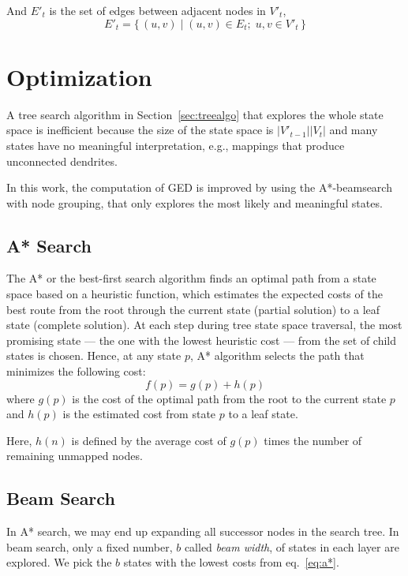 \documentclass[10pt,letterpaper]{article}
\begin{document}
And $E'_t$ is the set of edges between adjacent nodes in $V'_t$, 
\begin{equation}
E'_t = \{\, (u, v) \mid (u, v) \in E_t ;\; u, v \in V'_t \,\}
\end{equation}

\section{Optimization}
A tree search algorithm in Section~\ref{sec:treealgo} that explores the whole state space is inefficient because the size of the state space is $|V'_{t-1}||V_t|$ and many states have no meaningful interpretation, e.g., mappings that produce unconnected dendrites. 

In this work, the computation of GED is improved by using the A*-beamsearch \cite{neuhaus2006} with node grouping, that only explores the most likely and meaningful states.

\subsection{A* Search}
The A* or the best-first search algorithm finds an optimal path from a state space based on a heuristic function, which estimates the expected costs of the best route from the root through the current state (partial solution) to a leaf state (complete solution). At each step during tree state space traversal, the most promising state --- the one with the lowest heuristic cost --- from the set of child states is chosen. Hence, at any state $p$, A* algorithm selects the path that minimizes the following cost:
\begin{equation} \label{eq:a*}
f(p) = g(p) + h(p)
\end{equation}
where $g(p)$ is the cost of the optimal path from the root to the current state $p$ and $h(p)$ is the estimated cost from state $p$ to a leaf state. \cite{hart1968}

Here, $h(n)$ is defined by the average cost of $g(p)$ times the number of remaining unmapped nodes.

\subsection{Beam Search}
In A* search, we may end up expanding all successor nodes in the search tree. In beam search, only a fixed number, $b$ called \emph{beam width}, of states in each layer are explored. We pick the $b$ states with the lowest costs from eq.~\ref{eq:a*}. 
\end{document}
